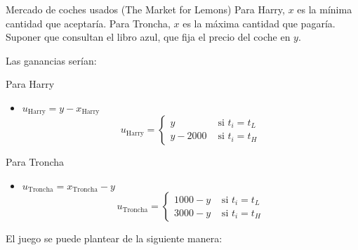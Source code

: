 \documentclass[12pt]{article}
\begin{document}
\begin{exbox}{Mercado de coches usados (The Market for Lemons)}
	Para Harry, $x$ es la mínima cantidad que aceptaría. Para Troncha, $x$ es la máxima cantidad que pagaría. Suponer que consultan el libro azul, que fija el precio del coche en $y$.

	Las ganancias serían:

	\begin{myitemize}
		\item Para Harry
		\begin{itemize}
			\item $u_{\text{Harry}}=y-x_{\text{Harry}}$
			      \[
				      u_{\text{Harry}}=\begin{cases}
					      y      & \text{ si } t_i = t_L \\
					      y-2000 & \text{ si } t_i = t_H
				      \end{cases}
			      \]
		\end{itemize}
		\item Para Troncha
		\begin{itemize}
			\item $u_{\text{Troncha}}=x_{\text{Troncha}} - y$
			      \[
				      u_{\text{Troncha}}=\begin{cases}
					      1000 - y & \text{ si } t_i = t_L \\
					      3000 - y & \text{ si } t_i = t_H
				      \end{cases}
			      \]
		\end{itemize}
	\end{myitemize}

	El juego se puede plantear de la siguiente manera:


\end{exbox}
\end{document}
